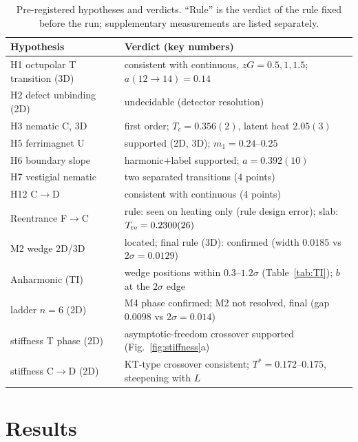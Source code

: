\documentclass[pre,twocolumn,superscriptaddress,amsmath,amssymb,floatfix]{revtex4-2}
\begin{document}
\begin{table}[tb]
\caption{Pre-registered hypotheses and verdicts. ``Rule'' is the verdict of the rule fixed before the run; supplementary measurements are listed separately.}
\label{tab:verdicts}
\begin{ruledtabular}
\begin{tabular}{p{}p{}}
Hypothesis & Verdict (key numbers)\\
\hline
H1 octupolar T transition (3D) & consistent with continuous, $zG=0.5,1,1.5$; $a(12\!\to\!14)=0.14$\\
H2 defect unbinding (2D) & undecidable (detector resolution)\\
H3 nematic C, 3D & first order; $T_c=0.356(2)$, latent heat $2.05(3)$\\
H5 ferrimagnet U & supported (2D, 3D); $m_1=0.24$--$0.25$\\
H6 boundary slope & harmonic+label supported; $a=0.392(10)$\\
H7 vestigial nematic & two separated transitions (4 points)\\
H12 C$\to$D & consistent with continuous (4 points)\\
Reentrance F$\to$C & rule: seen on heating only (rule design error); slab: $T_{\rm re}=0.2300(26)$\\
M2 wedge 2D/3D & located; final rule (3D): confirmed (width $0.0185$ vs $2\sigma=0.0129$)\\
Anharmonic (TI) & wedge positions within $0.3$--$1.2\sigma$ (Table~\ref{tab:TI}); $b$ at the $2\sigma$ edge\\
ladder $n=6$ (2D) & M4 phase confirmed; M2 not resolved, final (gap $0.0098$ vs $2\sigma=0.014$)\\
stiffness T phase (2D) & asymptotic-freedom crossover supported (Fig.~\ref{fig:stiffness}a)\\
stiffness C$\to$D (2D) & KT-type crossover consistent; $T^*=0.172$--$0.175$, steepening with $L$\\
\end{tabular}
\end{ruledtabular}
\end{table}

\section{Results}\label{sec:results}
\end{document}
